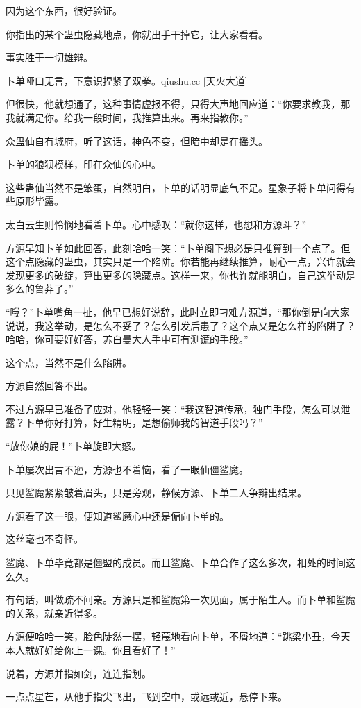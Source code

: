 \begin{this_body}
因为这个东西，很好验证。

你指出的某个蛊虫隐藏地点，你就出手干掉它，让大家看看。

事实胜于一切雄辩。

卜单哑口无言，下意识捏紧了双拳。qiushu.cc [天火大道]

但很快，他就想通了，这种事情虚报不得，只得大声地回应道：“你要求教我，那我就满足你。给我一段时间，我推算出来。再来指教你。”

众蛊仙自有城府，听了这话，神色不变，但暗中却是在摇头。

卜单的狼狈模样，印在众仙的心中。

这些蛊仙当然不是笨蛋，自然明白，卜单的话明显底气不足。星象子将卜单问得有些原形毕露。

太白云生则怜悯地看着卜单。心中感叹：“就你这样，也想和方源斗？”

方源早知卜单如此回答，此刻哈哈一笑：“卜单阁下想必是只推算到一个点了。但这个点隐藏的蛊虫，其实只是一个陷阱。你若能再继续推算，耐心一点，兴许就会发现更多的破绽，算出更多的隐藏点。这样一来，你也许就能明白，自己这举动是多么的鲁莽了。”

“哦？”卜单嘴角一扯，他早已想好说辞，此时立即刁难方源道，“那你倒是向大家说说，我这举动，是怎么不妥了？怎么引发后患了？这个点又是怎么样的陷阱了？哈哈，你可要好好答，苏白曼大人手中可有测谎的手段。”

这个点，当然不是什么陷阱。

方源自然回答不出。

不过方源早已准备了应对，他轻轻一笑：“我这智道传承，独门手段，怎么可以泄露？卜单你好打算，好生精明，是想偷师我的智道手段吗？”

“放你娘的屁！”卜单旋即大怒。

卜单屡次出言不逊，方源也不着恼，看了一眼仙僵鲨魔。

只见鲨魔紧紧皱着眉头，只是旁观，静候方源、卜单二人争辩出结果。

方源看了这一眼，便知道鲨魔心中还是偏向卜单的。

这丝毫也不奇怪。

鲨魔、卜单毕竟都是僵盟的成员。而且鲨魔、卜单合作了这么多次，相处的时间这么久。

有句话，叫做疏不间亲。方源只是和鲨魔第一次见面，属于陌生人。而卜单和鲨魔的关系，就亲近得多。

方源便哈哈一笑，脸色陡然一摆，轻蔑地看向卜单，不屑地道：“跳梁小丑，今天本人就好好给你上一课。你且看好了！”

说着，方源并指如剑，连连指划。

一点点星芒，从他手指尖飞出，飞到空中，或远或近，悬停下来。


\end{this_body}
